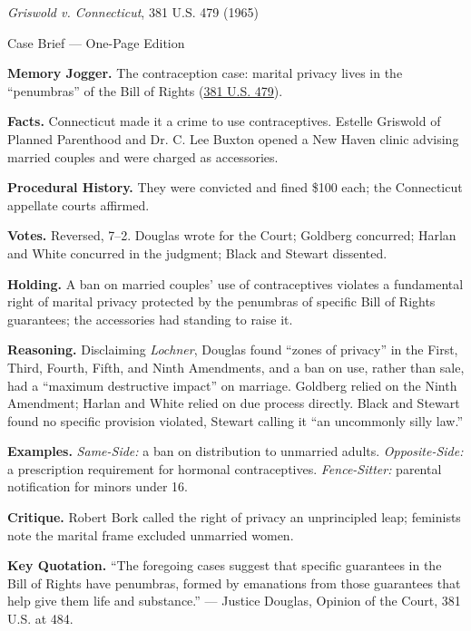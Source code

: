 \documentclass[12pt]{article}
\begin{document}
\begin{center}
{\Large \textit{Griswold v. Connecticut}, 381 U.S. 479 (1965)\par}
\vspace{0.3em}
{\normalsize Case Brief --- One-Page Edition\par}
\end{center}

\textbf{Memory Jogger.} The contraception case: marital privacy lives in the ``penumbras'' of the Bill of Rights (\href{https://supreme.justia.com/cases/federal/us/381/479/}{381 U.S. 479}).

\textbf{Facts.} Connecticut made it a crime to use contraceptives. Estelle Griswold of Planned Parenthood and Dr. C. Lee Buxton opened a New Haven clinic advising married couples and were charged as accessories.

\textbf{Procedural History.} They were convicted and fined \$100 each; the Connecticut appellate courts affirmed.

\textbf{Votes.} Reversed, 7--2. Douglas wrote for the Court; Goldberg concurred; Harlan and White concurred in the judgment; Black and Stewart dissented.

\textbf{Holding.} A ban on married couples' use of contraceptives violates a fundamental right of marital privacy protected by the penumbras of specific Bill of Rights guarantees; the accessories had standing to raise it.

\textbf{Reasoning.} Disclaiming \textit{Lochner}, Douglas found ``zones of privacy'' in the First, Third, Fourth, Fifth, and Ninth Amendments, and a ban on use, rather than sale, had a ``maximum destructive impact'' on marriage. Goldberg relied on the Ninth Amendment; Harlan and White relied on due process directly. Black and Stewart found no specific provision violated, Stewart calling it ``an uncommonly silly law.''

\textbf{Examples.} \emph{Same-Side:} a ban on distribution to unmarried adults. \emph{Opposite-Side:} a prescription requirement for hormonal contraceptives. \emph{Fence-Sitter:} parental notification for minors under 16.

\textbf{Critique.} Robert Bork called the right of privacy an unprincipled leap; feminists note the marital frame excluded unmarried women.

\textbf{Key Quotation.} ``The foregoing cases suggest that specific guarantees in the Bill of Rights have penumbras, formed by emanations from those guarantees that help give them life and substance.'' --- Justice Douglas, Opinion of the Court, 381 U.S. at 484.
\end{document}
